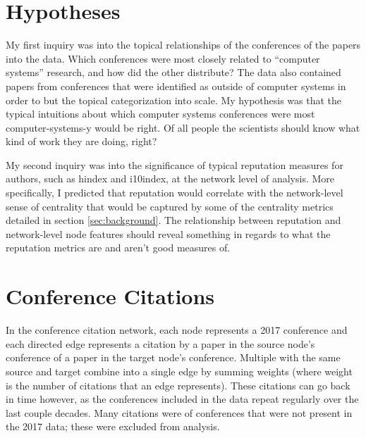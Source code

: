 \documentclass{article}
\begin{document}
\section{Hypotheses}
\label{sec:hypotheses}

My first inquiry was into the topical relationships of the conferences of the papers into the data.
Which conferences were most closely related to ``computer systems'' research, and how did the other distribute?
The data also contained papers from conferences that were identified as outside of computer systems in order to but the topical categorization into scale.
My hypothesis was that the typical intuitions about which computer systems conferences were most computer-systems-y would be right.
Of all people the scientists should know what kind of work they are doing, right?

My second inquiry was into the significance of typical reputation measures for authors, such as hindex and i10index, at the network level of analysis. More specifically, I predicted that reputation would correlate with the network-level sense of centrality that would be captured by some of the centrality metrics detailed in section \ref{sec:background}. The relationship between reputation and network-level node features should reveal something in regards to what the reputation metrics are and aren't good measures of.

\section{Conference Citations}
\label{sec:conference-citation}

In the conference citation network, each node represents a 2017 conference and each directed edge represents a citation by a paper in the source node's conference of a paper in the target node's conference.
Multiple with the same source and target combine into a single edge by summing weights (where weight is the number of citations that an edge represents).
These citations can go back in time however, as the conferences included in the data repeat regularly over the last couple decades.
Many citations were of conferences that were not present in the 2017 data; these were excluded from analysis.
\end{document}
